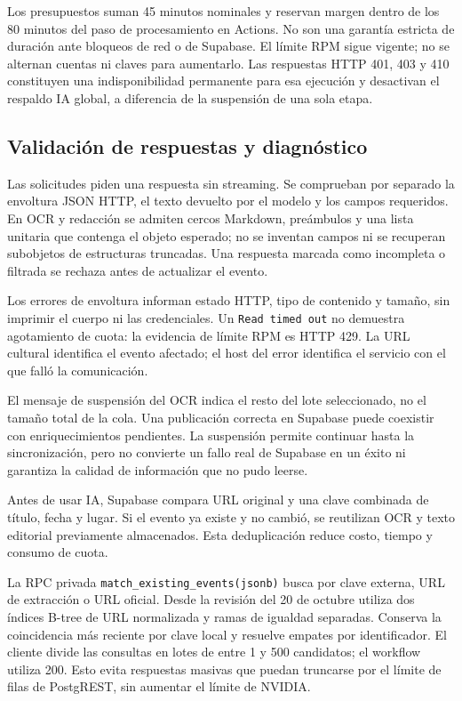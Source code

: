 \documentclass[11pt,a4paper]{article}
\begin{document}
Los presupuestos suman 45 minutos nominales y reservan margen dentro de los 80 minutos del paso de procesamiento en Actions. No son una garant\'{i}a estricta de duraci\'{o}n ante bloqueos de red o de Supabase. El l\'{i}mite RPM sigue vigente; no se alternan cuentas ni claves para aumentarlo. Las respuestas HTTP 401, 403 y 410 constituyen una indisponibilidad permanente para esa ejecuci\'{o}n y desactivan el respaldo IA global, a diferencia de la suspensi\'{o}n de una sola etapa.

\subsection{Validaci\'{o}n de respuestas y diagn\'{o}stico}

Las solicitudes piden una respuesta sin streaming. Se comprueban por separado la envoltura JSON HTTP, el texto devuelto por el modelo y los campos requeridos. En OCR y redacci\'{o}n se admiten cercos Markdown, pre\'{a}mbulos y una lista unitaria que contenga el objeto esperado; no se inventan campos ni se recuperan subobjetos de estructuras truncadas. Una respuesta marcada como incompleta o filtrada se rechaza antes de actualizar el evento.

Los errores de envoltura informan estado HTTP, tipo de contenido y tama\~{n}o, sin imprimir el cuerpo ni las credenciales. Un \texttt{Read timed out} no demuestra agotamiento de cuota: la evidencia de l\'{i}mite RPM es HTTP 429. La URL cultural identifica el evento afectado; el host del error identifica el servicio con el que fall\'{o} la comunicaci\'{o}n.

El mensaje de suspensi\'{o}n del OCR indica el resto del lote seleccionado, no el tama\~{n}o total de la cola. Una publicaci\'{o}n correcta en Supabase puede coexistir con enriquecimientos pendientes. La suspensi\'{o}n permite continuar hasta la sincronizaci\'{o}n, pero no convierte un fallo real de Supabase en un \'{e}xito ni garantiza la calidad de informaci\'{o}n que no pudo leerse.

Antes de usar IA, Supabase compara URL original y una clave combinada de t\'{i}tulo, fecha y lugar. Si el evento ya existe y no cambi\'{o}, se reutilizan OCR y texto editorial previamente almacenados. Esta deduplicaci\'{o}n reduce costo, tiempo y consumo de cuota.

La RPC privada \texttt{match\_existing\_events(jsonb)} busca por clave externa, URL de extracci\'{o}n o URL oficial. Desde la revisi\'{o}n del 20 de octubre utiliza dos \'{i}ndices B-tree de URL normalizada y ramas de igualdad separadas. Conserva la coincidencia m\'{a}s reciente por clave local y resuelve empates por identificador. El cliente divide las consultas en lotes de entre 1 y 500 candidatos; el workflow utiliza 200. Esto evita respuestas masivas que puedan truncarse por el l\'{i}mite de filas de PostgREST, sin aumentar el l\'{i}mite de NVIDIA.
\end{document}
